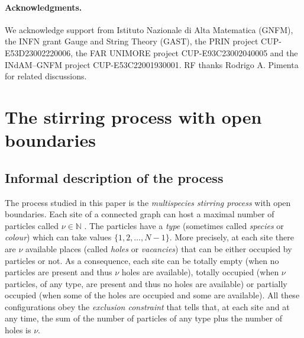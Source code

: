 \documentclass[10pt]{article}
\numberwithin{equation}{section}
\numberwithin{equation}{subsection}
\newcommand{\fra}[1]{\textcolor[rgb]{0,0,1}{#1}}
\begin{document}
\bigskip





\paragraph{Acknowledgments.} We acknowledge support from Istituto Nazionale di Alta Matematica (GNFM),  the INFN grant Gauge and String Theory (GAST),  the PRIN project CUP-E53D23002220006,  the FAR UNIMORE project CUP-E93C23002040005 and  the INdAM–GNFM project CUP-E53C22001930001. RF thanks  Rodrigo A. Pimenta for related discussions. 




\section{The stirring process with open boundaries}
\label{sec1}
\subsection{Informal description of the process}
The process studied in this paper is the {\em multispecies stirring process}
with open boundaries. 
Each site
of a connected graph can host a maximal number of particles called $\nu\in \mathbb{N}$ .
The particles have a {\em type} (sometimes called {\em species} or {\em colour})
which can \fra{take}  values $\{1,2,\ldots,N-1\}$. {More precisely, at each site there are $\nu$ available places (called \textit{holes} or \textit{vacancies}) that can be either occupied by particles or not. As a consequence, each site can be totally empty (when no particles are present and thus $\nu$ holes are available), totally occupied (when $\nu$ particles, of any type, are present and thus no holes are available) or partially occupied (when some of the holes are occupied and some are available). All these configurations obey the \textit{exclusion constraint} that tells that, at each site and at any time, the sum of the number of particles of any type plus the number of holes is $\nu$.}
\end{document}
